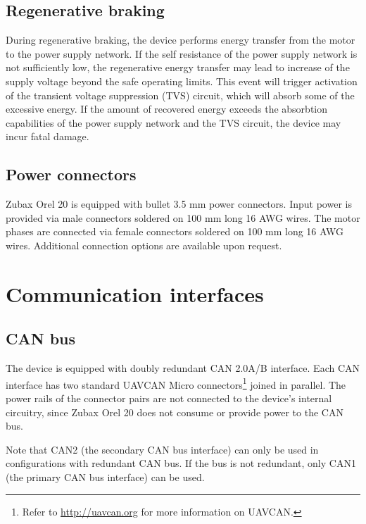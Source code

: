 \documentclass{zubaxdoc}
\begin{document}
\subsection{Regenerative braking}

During regenerative braking, the device performs energy transfer from the motor to the power supply network.
If the self resistance of the power supply network is not sufficiently low,
the regenerative energy transfer may lead to increase of the supply voltage beyond
the safe operating limits.
This event will trigger activation of the transient voltage suppression (TVS) circuit,
which will absorb some of the excessive energy.
If the amount of recovered energy exceeds the absorbtion capabilities of the power supply
network and the TVS circuit, the device may incur fatal damage.

\subsection{Power connectors}

Zubax Orel 20 is equipped with bullet 3.5 mm power connectors.
Input power is provided via male connectors soldered on 100 mm long 16 AWG wires.
The motor phases are connected via female connectors soldered on 100 mm long 16 AWG wires.
Additional connection options are available upon request.

\section{Communication interfaces}

\subsection{CAN bus}

The device is equipped with doubly redundant CAN 2.0A/B interface.
Each CAN interface has two standard UAVCAN Micro connectors\footnote{Refer to
\url{http://uavcan.org} for more information on UAVCAN.}
joined in parallel.
The power rails of the connector pairs are not connected to the device's internal circuitry,
since Zubax Orel 20 does not consume or provide power to the CAN bus.

Note that CAN2 (the secondary CAN bus interface) can only be used in configurations with redundant CAN bus.
If the bus is not redundant, only CAN1 (the primary CAN bus interface) can be used.
\end{document}
